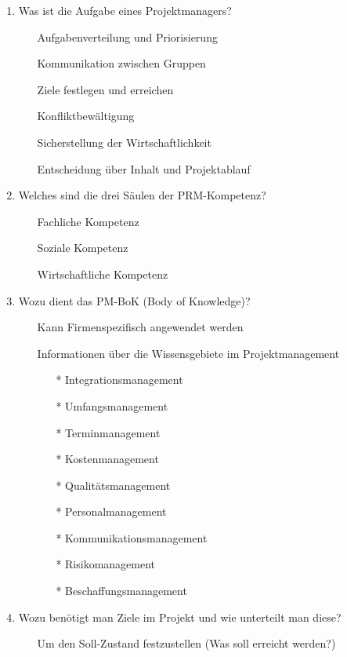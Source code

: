 \documentclass[12pt,a4paper]{article}
\begin{document}
\begin{enumerate}
	\item Was ist die Aufgabe eines Projektmanagers?
		\begin{enumerate}
		\item[] Aufgabenverteilung und Priorisierung 
		\item[] Kommunikation zwischen Gruppen 
		\item[] Ziele festlegen und erreichen  
		\item[] Konfliktbewältigung 
		\item[] Sicherstellung der Wirtschaftlichkeit  
		\item[] Entscheidung über Inhalt und Projektablauf 
		\end{enumerate}
	\item Welches sind die drei Säulen der PRM-Kompetenz?
		\begin{enumerate}
		\item[] Fachliche Kompetenz 
		\item[] Soziale Kompetenz
		\item[] Wirtschaftliche Kompetenz 
		\end{enumerate}
	\item Wozu dient das PM-BoK (Body of Knowledge)?
		\begin{enumerate}
		\item[] Kann Firmenspezifisch angewendet werden 
		\item[] Informationen über die Wissensgebiete im Projektmanagement  
			\begin{enumerate}
			\item[*] Integrationsmanagement
			\item[*] Umfangsmanagement
			\item[*] Terminmanagement
			\item[*] Kostenmanagement
			\item[*] Qualitätsmanagement
			\item[*] Personalmanagement
			\item[*] Kommunikationsmanagement
			\item[*] Risikomanagement
			\item[*] Beschaffungsmanagement
			\end{enumerate}
		\end{enumerate}
	\item Wozu benötigt man Ziele im Projekt und wie unterteilt man diese?
		\begin{enumerate}
		\item[] Um den Soll-Zustand festzustellen (Was soll erreicht werden?) 

\end{enumerate}
\end{enumerate}
\end{document}
